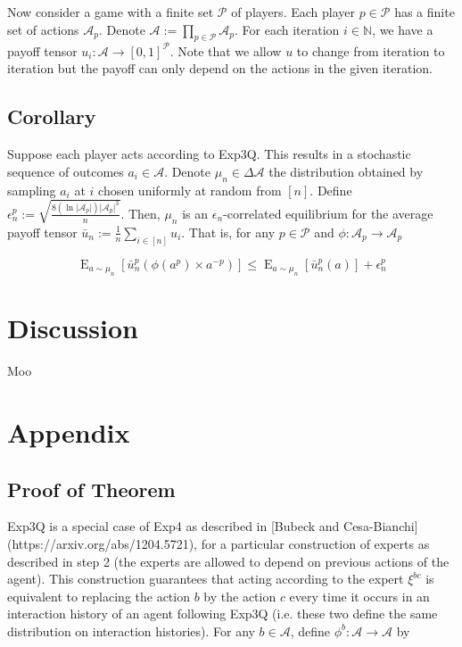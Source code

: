 \documentclass[a4paper]{article}
\DeclareMathOperator{\E}{E}
\newcommand{\Nats}{\mathbb{N}}
\newcommand{\Abs}[1]{\lvert #1 \rvert}
\newcommand{\Act}{\mathcal{A}}
\newcommand{\Play}{\mathcal{P}}
\begin{document}
Now consider a game with a finite set ${\Play}$ of players. Each player ${p \in \Play}$ has a finite set of actions ${\Act_p}$. Denote ${\Act:=\prod_{p \in \Play} \Act_p}$. For each iteration ${i \in \Nats}$, we have a payoff tensor ${u_i: \Act \rightarrow [0,1]^\Play}$. Note that we allow ${u}$ to change from iteration to iteration but the payoff can only depend on the actions in the given iteration.

\subsection{Corollary}

Suppose each player acts according to Exp3Q. This results in a stochastic sequence of outcomes ${a_i \in \Act}$. Denote ${\mu_n \in \Delta \Act}$ the distribution obtained by sampling ${a_i}$ at ${i}$ chosen uniformly at random from ${[n]}$. Define ${\epsilon_n^p:=\sqrt{\frac{8(\ln \Abs{\Act_p}) \Abs{\Act_p}^3}{n}}}$. Then, ${\mu_n}$ is an ${\epsilon_n}$-correlated equilibrium for the average payoff tensor $\bar{u}_n:={\frac{1}{n} \sum_{i \in [n]} u_i}$. That is, for any ${p \in \Play}$ and ${\phi: \Act_p \rightarrow \Act_p}$

$$\E_{a \sim \mu_n}[\bar{u}_n^p(\phi(a^p) \times a^{-p})] \leq \E_{a \sim \mu_n}[\bar{u}_n^p(a)] + \epsilon_n^p$$

\section{Discussion}

Moo

\section{Appendix}

\subsection{Proof of Theorem}

Exp3Q is a special case of Exp4 as described in [Bubeck and Cesa-Bianchi](https://arxiv.org/abs/1204.5721), for a particular construction of experts as described in step 2 (the experts are allowed to depend on previous actions of the agent). This construction guarantees that acting according to the expert ${\xi^{bc}}$ is equivalent to replacing the action ${b}$ by the action ${c}$ every time it occurs in an interaction history of an agent following Exp3Q (i.e. these two define the same distribution on interaction histories). For any ${b \in \Act}$, define ${\phi^b: \Act \rightarrow \Act}$ by
\end{document}
